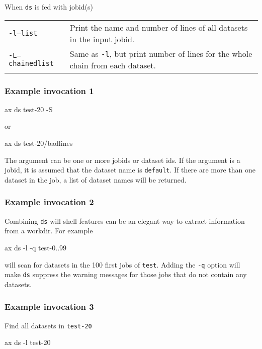 When \texttt{ds} is fed with jobid(s)
\begin{snugshade}
\begin{tabular}{p{4cm}p{9cm}}
  \texttt{-l}\hspace{3cm}\texttt{---list} & Print the name and number
  of lines of all datasets in the input jobid.\\[2ex]
  \texttt{-L}\hspace{3cm}\texttt{---chainedlist} & Same as \texttt{-l},
  but print number of lines for the whole chain from each dataset.\\
\end{tabular}
\end{snugshade}

\subsubsection*{Example invocation 1}
\begin{shell}
ax ds test-20 -S
\end{shell}
or
\begin{shell}
ax ds test-20/badlines
\end{shell}

The argument can be one or more jobids or dataset ids.  If the
argument is a jobid, it is assumed that the dataset name is
\texttt{default}.  If there are more than one dataset in the job, a
list of dataset names will be returned.

\subsubsection*{Example invocation 2}
Combining \texttt{ds} will shell features can be an elegant way to
extract information from a workdir.  For example
\begin{shell}
ax ds -l -q test-{0..99}
\end{shell}
will scan for datasets in the 100 first jobs of \texttt{test}.
Adding the \texttt{-q} option will make \texttt{ds} suppress the
warning messages for those jobs that do not contain any datasets.

\subsubsection*{Example invocation 3}
Find all datasets in \texttt{test-20}
\begin{shell}
ax ds -l test-20
\end{shell}

